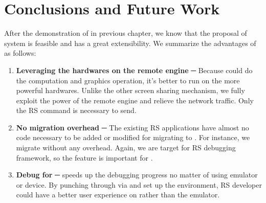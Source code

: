 \chapter{Conclusions and Future Work}
\label{c:conclusions}

After the demonstration of \Fountain{} in previous chapter, we know that the proposal of \RRS{} system is feasible and has a great extensibility. We summarize the advantages of \RRS{} as follows:
\begin{enumerate}
\item \textbf{Leveraging the hardwares on the remote engine} ─ Because \RS{} could do the computation and graphics operation, it's better to run on the more powerful hardwares. Unlike the other screen sharing mechanism, we fully exploit the power of the remote engine and relieve the network traffic. Only the RS command is necessary to send.
\item \textbf{No migration overhead} ─ The existing RS applications have almost no code necessary to be added or modified for migrating to \RRS{}. For instance, we migrate \Fountain{} without any overhead. Again, we are target for RS debugging framework, so the feature is important for \RRS{}.
\item \textbf{Debug for \RS{}} ─ \RRS{} speeds up the debugging progress no matter of using emulator or device. By punching through via \RRS{} and set up the environment, RS developer could have a better user experience on \RRS{} rather than the emulator. 
\end{enumerate}

%
%
%
%

